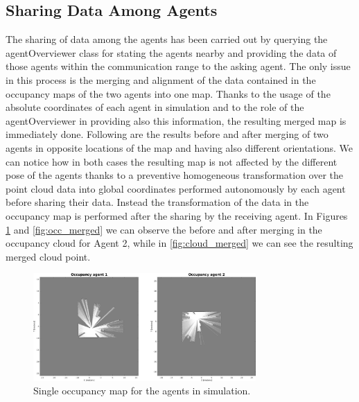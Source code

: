 \documentclass[twocolumn, a4paper]{article}
\begin{document}
\subsection{Sharing Data Among Agents}
The sharing of data among the agents has been carried out by querying the
agentOverviewer class for stating the agents nearby and providing the
data of those agents within the communication range to the asking agent.
The only issue in this process is the merging and alignment of the data
contained in the occupancy maps of the two agents into one map. Thanks to
the usage of the absolute coordinates of each agent in simulation and to
the role of the agentOverviewer in providing also this information, the
resulting merged map is immediately done. Following are the results before
and after merging of two agents in opposite locations of the map and having
also different orientations. We can notice how in both cases the resulting
map is not affected by the different pose of the agents thanks to a 
preventive homogeneous transformation over the point cloud data into global
coordinates performed autonomously by each agent before sharing their data.
Instead the transformation of the data in the occupancy map is performed
after the sharing by the receiving agent. In Figures \ref{fig:occ_single} and
\ref{fig:occ_merged} we can observe the before and after merging in the
occupancy cloud for Agent 2, while in \ref{fig:cloud_merged} we can see
the resulting merged cloud point.
\vspace{0.5cm}
\begin{figure}[h!]
    \centering
    \includegraphics[width=8.5cm]{"../Report_images/Single_occupancies.png"}
    \caption{Single occupancy map for the agents in simulation.}
    \label{fig:occ_single}
\end{figure}
\vfill
\end{document}
